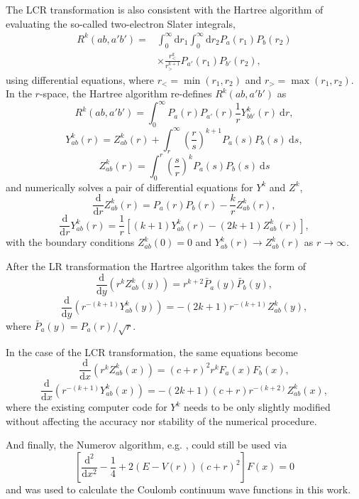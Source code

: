\documentclass[aip
, pra
, showpacs
, aps
, twocolumn
, groupedaddress
, floatfix
]{revtex4}
\newcommand{\beq}{\begin{equation}}
\newcommand{\eeq}{\end{equation}}
\newcommand{\dd}{\mbox{d}}
\newcommand{\dr}{\mbox{d} r}
\begin{document}
The LCR transformation is also consistent with the Hartree algorithm \cite{H57} of evaluating the so-called two-electron Slater integrals,
\beq
\begin{array}{ll}
R^k(a b, a' b')= & \int_0^{\infty} \dr_1 \int_0^{\infty} \dr_2 P_a(r_1) P_b(r_2) \\
 & \times \frac{r^k_{<}}{r^{k+1}_{>}} P_{a'}(r_1) P_{b'}(r_2),
\end{array}
\label{R_k}
\eeq
using differential equations, where $r_{<}=\min(r_1, r_2)$ and $r_{>}=\max(r_1, r_2)$. In the $r$-space, the Hartree algorithm re-defines $R^k(a b, a' b')$ as
\beq
R^k(a b, a' b')= \int_0^{\infty} P_a(r) P_{a'}(r)
 \frac{1}{r} Y^k_{b b'}(r) \ \dr,
\label{R_k_from_Y}
\eeq
\beq
Y^k_{ab}(r) = Z^k_{ab}(r)
+ \int_r^{\infty} \left( \frac{r}{s} \right)^{k+1} P_a(s) P_{b}(s) \ \dd s,
\label{Y_k}
\eeq
\beq
Z^k_{ab}(r) = \int_0^r \left( \frac{s}{r} \right)^k P_a(s) P_{b}(s) \ \dd s
\label{Z_k}
\eeq
and numerically solves a pair of differential equations for $Y^k$ and $Z^k$,
\beq
\frac{\dd}{\dd r} Z^k_{ab}(r) = P_a(r) P_{b}(r) - \frac{k}{r} Z^k_{ab}(r), \label{Z_k_eq} \eeq
\beq
\frac{\dd}{\dd r} Y^k_{ab}(r) = \frac{1}{r} \left[ (k+1) Y^k_{ab}(r) - (2k+1) Z^k_{ab}(r) \right],
\label{Y_k_eq}
\eeq
with the boundary conditions $Z^k_{ab}(0)=0$ and $Y^k_{ab}(r) \rightarrow Z^k_{ab}(r)$ as $r \rightarrow \infty$.


After the LR transformation the Hartree algorithm takes the form \cite{FFBJ97} of
\beq
\frac{\dd}{\dd y} \left( r^k Z^k_{ab}(y) \right) = r^{k+2} \bar{P}_a(y) \bar{P}_{b}(y), \label{Z_k_eq_LR} \eeq
\beq
\frac{\dd}{\dd y} \left( r^{-(k+1)} Y^k_{ab}(y) \right) = -(2k+1)r^{-(k+1)} Z^k_{ab}(y),
\label{Y_k_eq_LR}
\eeq
where $\bar{P}_a(y)=P_a(r)/\sqrt{r}$.


In the case of the LCR transformation, the same equations become
\beq
\frac{\dd}{\dd x} \left( r^k Z^k_{ab}(x) \right) = (c+r)^2r^k F_a(x) F_{b}(x), \label{Z_k_eq_LCR} \eeq
\beq
\frac{\dd}{\dd x} \left( r^{-(k+1)} Y^k_{ab}(x) \right) = -(2k+1)(c+r)r^{-(k+2)} Z^k_{ab}(x),
\label{Y_k_eq_LCR}
\eeq
where the existing computer code for $Y^k$ \cite{FF87} needs to be only slightly modified without affecting the accuracy nor stability of the numerical procedure.

And finally, the Numerov algorithm, e.g. \cite{JS02}, could still be used  via
\beq
\left[ \frac{\dd^2}{\dd x^2} - \frac{1}{4} + 2(E-V(r)) (c+r)^2 \right] F(x) = 0
\eeq
and was used to calculate the Coulomb continuum wave functions in this work.
\end{document}
